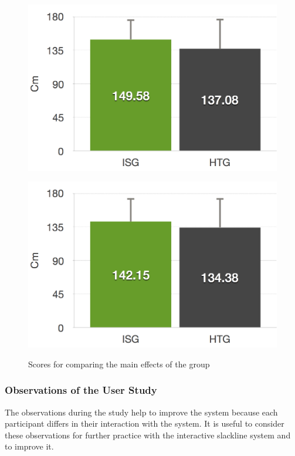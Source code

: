 \begin{figure}[htb]
\begin{minipage}[t]{0.40\linewidth}
		\includegraphics[width=1\linewidth]{Pictures/6_4_DIA_DistanceLeftGroupEffect}
		\label{fig:6_4_distanceLeftGroupEffect}
	\end{minipage}
	\hfill
	\begin{minipage}[t]{0.40\linewidth}
		\centering
		\includegraphics[width=1\linewidth]{Pictures/6_4_DIA_DistanceRightGroupEffect}
		\label{fig:6_4_distanceRightGroupEffect}
	\end{minipage}
	\caption{Scores for comparing the main effects of the group}
	\label{fig:6_4_mainEffectGroup}
\end{figure}

\subsubsection{Observations of the User Study}\label{6_4_slacklineObservations}
The observations during the study help to improve the system because each participant differs in their interaction with the system.
It is useful to consider these observations for further practice with the interactive slackline system and to improve it.

